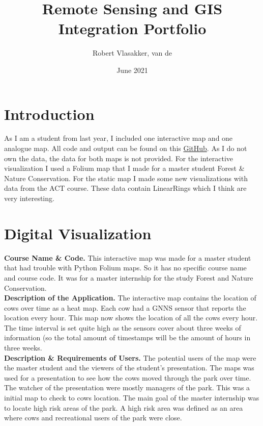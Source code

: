 \documentclass{article}
\title{Remote Sensing and GIS Integration Portfolio}
\author{Robert Vlasakker, van de}
\date{June 2021}
\begin{document}
\maketitle
\section{Introduction}
As I am a student from last year, I included one interactive map and one analogue map.
All code and output can be found on this \href{https://github.com/RobertvdV/GRS60312_RemoteSensingAndGISIntergration_IDV_Portfolio}{GitHub}.
As I do not own the data, the data for both maps is not provided.
For the interactive visualization I used a Folium map that I made for a master student Forest \& Nature Conservation. 
For the static map I made some new visualizations with data from the ACT course. 
These data contain LinearRings which I think are very interesting.

\section{Digital Visualization}
\textbf{Course Name \& Code.}
This interactive map was made for a master student that had trouble with Python Folium maps. 
So it has no specific course name and course code. 
It was for a master internship for the study Forest and Nature Conservation.
\\

\noindent
\textbf{Description of the Application.}
The interactive map contains the location of cows over time as a heat map. 
Each cow had a GNNS sensor that reports the location every hour.
This map now shows the location of all the cows every hour. 
The time interval is set quite high as the sensors cover about three weeks of information (so the total amount of timestamps will be the amount of hours in three weeks.
\\

\noindent
\textbf{Description \& Requirements of Users.}
The potential users of the map were the master student and the viewers of the student's presentation.
The maps was used for a presentation to see how the cows moved through the park over time.
The watcher of the presentation were mostly managers of the park. 
This was a initial map to check to cows location. 
The main goal of the master internship was to locate high risk areas of the park.
A high risk area was defined as an area where cows and recreational users of the park were close.
\\
\end{document}
